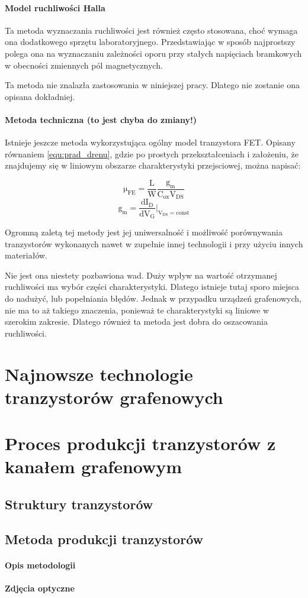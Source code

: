 \paragraph{Model ruchliwości Halla}
Ta metoda wyznaczania ruchliwości jest również często stosowana, choć wymaga ona dodatkowego sprzętu laboratoryjnego. 
Przedstawiając w sposób najprostszy polega ona na wyznaczaniu zależności oporu przy stałych napięciach bramkowych
w obecności zmiennych pól magnetycznych. 

Ta metoda nie znalazła zastosowania w niniejszej pracy. Dlatego nie zostanie ona opisana dokładniej.

\paragraph{Metoda techniczna (to jest chyba do zmiany!)}
Istnieje jeszcze metoda wykorzystująca ogólny model tranzystora FET. Opisany równaniem \ref{equ:prad_drenu}, gdzie po 
prostych przekształceniach i założeniu, że znajdujemy się w liniowym obszarze charakterystyki przejsciowej, można napisać:

\begin{equation}
    \mathrm{ \mu_{FE} = \frac{L}{W}\frac{g_m}{C_{ox}V_{DS}}}
\end{equation}
\begin{equation}
    \mathrm{ g_m = \frac{d I_D}{d V_G} |_{ V_{DS}=const}}
\end{equation}

Ogromną zaletą tej metody jest jej uniwersalność i możliwość porównywania tranzystorów wykonanych nawet w zupełnie innej
technologii i przy użyciu innych materiałów. 

Nie jest ona niestety pozbawiona wad. Duży wpływ na wartość otrzymanej ruchliwości ma wybór części charakterystyki. 
Dlatego istnieje tutaj sporo miejsca do nadużyć, lub popełniania błędów. Jednak w przypadku urządzeń grafenowych, nie ma
to aż takiego znaczenia, ponieważ te charakterystyki są liniowe w szerokim zakresie. Dlatego również ta metoda jest dobra
do oszacowania ruchliwości.

	\section{Najnowsze technologie tranzystorów grafenowych}

	\section{Proces produkcji tranzystorów z kanałem grafenowym}
		\subsection{Struktury tranzystorów}
		\subsection{Metoda produkcji tranzystorów}
			\paragraph{Opis metodologii}
			\paragraph{Zdjęcia optyczne}
